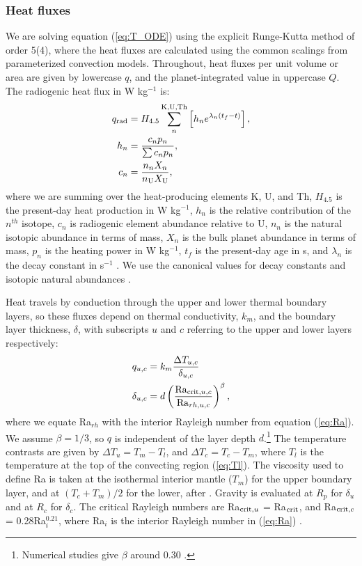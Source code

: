 \subsubsection{Heat fluxes}
We are solving equation (\ref{eq:T_ODE}) using the explicit Runge-Kutta method of order 5(4), where the heat fluxes are calculated using the common scalings from parameterized convection models. Throughout, heat fluxes per unit volume or area are given by lowercase $q$, and the planet-integrated value in uppercase $Q$. The radiogenic heat flux in W kg$^{-1}$ is:
\begin{align}
q_{\rm rad} &= H_{4.5}\sum^{\rm K, U, Th}_n \left[ h_{n}  e^{\lambda_n (t_f - t)} \right], \nonumber \\
h_n &= \frac{c_n p_n}{\sum c_n p_n}, \\
c_n &= \frac{n_nX_n}{n_{\rm U} X_{\rm U}} \nonumber ,
\end{align}
where we are summing over the heat-producing elements K, U, and Th, $H_{4.5}$ is the present-day heat production in W kg$^{-1}$, $h_n$ is the relative contribution of the $n^{th}$ isotope, $c_n$ is radiogenic element abundance relative to U, $n_n$ is the natural isotopic abundance in terms of mass, $X_n$ is the bulk planet abundance in terms of mass, $p_n$ is the heating power in W kg$^{-1}$, $t_f$ is the present-day age in s, and $\lambda_n$ is the decay constant in s$^{-1}$ \citep{Korenaga2006}. We use the canonical values for decay constants and isotopic natural abundances \citep{Jaupart2015}.

Heat travels by conduction through the upper and lower thermal boundary layers, so these fluxes depend on thermal conductivity, $k_m$, and the boundary layer thickness, $\delta$, with subscripts $u$ and $c$ referring to the upper and lower layers respectively: 
\begin{align}
q_{u, c} &= k_m \frac{\Delta T_{u, c}}{\delta_{u, c}} \label{eq:q_u}\\
\delta_{u, c} &= d \left(\frac{{\rm Ra}_{{\rm crit}, u, c}}{{\rm Ra}_{rh, u, c}}\right)^\beta,\label{eq:d_u}
\end{align}
where we equate Ra$_{rh}$ with the interior Rayleigh number from equation (\ref{eq:Ra}). We assume $\beta = 1/3$, so $q$ is independent of the layer depth $d$.\footnote{Numerical studies give $\beta$ around 0.30 \citep{Thiriet2019}.} The temperature contrasts are given by $\Delta T_u = T_m - T_l$, and $\Delta T_c = T_c - T_m$, where $T_l$ is the temperature at the top of the convecting region (\ref{eq:Tl}). The viscosity used to define Ra is taken at the isothermal interior mantle ($T_m$) for the upper boundary layer, and at $(T_c + T_m)/2$ for the lower, after \citet{Thiriet2019}. Gravity is evaluated at $R_p$ for $\delta_u$ and at $R_c$ for $\delta_c$. The critical Rayleigh numbers are Ra$_{{\rm crit}, u}$ = Ra$_{{\rm crit}}$, and Ra$_{{\rm crit}, c}$ = 0.28Ra$_{i}^{0.21}$, where Ra$_{i}$ is the interior Rayleigh number in (\ref{eq:Ra}) \citep{Thiriet2019}.





